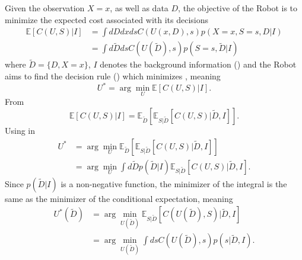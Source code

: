 Given the observation $X=x$, as well as data $D$, the objective of the Robot is to minimize the expected cost associated with its decisions\cite{murphy2023probabilistic}
\begin{equation}
	\begin{split}
		\mathbb{E}[C(U, S)|I] &= \int dD dx ds  C(U(x,D),s) p(X=x,S=s,D|I)\\
		& = \int d\tilde{D} ds  C(U(\tilde{D}),s) p(S=s,\tilde{D}|I)
	\end{split}
	\label{eq:conditional_expected_cost}
\end{equation}
where $\tilde{D} = \{D,X= x\}$, $I$ denotes the background information () and the Robot aims to find the decision rule () which minimizes , meaning
\begin{equation}
	U^* = \arg\min_{U} \mathbb{E}[C(U, S)|I].
	\label{eq:decision_rule_x}
\end{equation}	
From 
\begin{equation}
	\mathbb{E}[C(U, S)|I] = \mathbb{E}_{\tilde{D}}[\mathbb{E}_{S|\tilde{D}}[C(U, S)|\tilde{D},I]].
	\label{eq:total2}
\end{equation}
Using  in 
\begin{equation}
	\begin{split}
		U^* &= \arg\min_{U} \mathbb{E}_{\tilde{D}}[\mathbb{E}_{S|\tilde{D}}[C(U, S)|\tilde{D},I]]\\
		&= \arg\min_{U} \int d\tilde{D}p(\tilde{D}|I) \mathbb{E}_{S|\tilde{D}}[C(U, S)|\tilde{D},I].
	\end{split}
	\label{eq:decision_rule2}
\end{equation}
Since $p(\tilde{D}|I)$ is a non-negative function, the minimizer of the integral is the same as the minimizer of the conditional expectation, meaning
\begin{equation}
	\begin{split}
		U^*(\tilde{D}) &= \arg\min_{U(\tilde{D})} \mathbb{E}_{S|\tilde{D}}[C(U(\tilde{D}), S)|\tilde{D},I]\\
		& = \arg\min_{U(\tilde{D})}\int  ds C(U(\tilde{D}),s) p(s|\tilde{D},I).
	\end{split}
	\label{eq:decision_rule3}
\end{equation}

